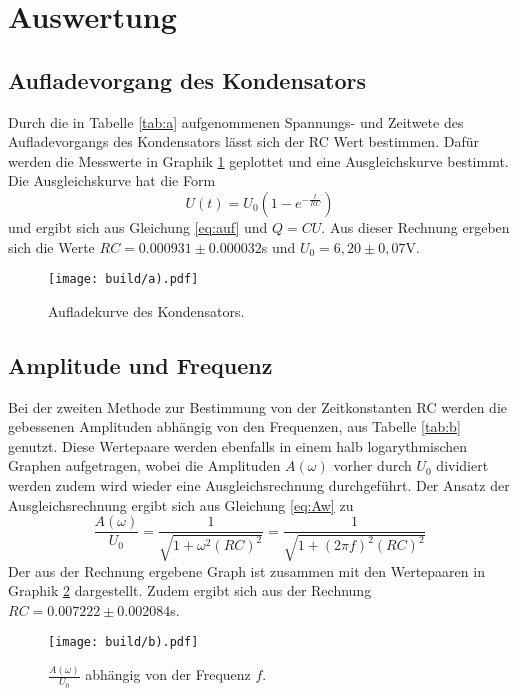 \section{Auswertung}
\label{sec:Auswertung}

\subsection{Aufladevorgang des Kondensators}
\label{sec:Auswertung1}

Durch die in Tabelle \ref{tab:a} aufgenommenen Spannungs- und Zeitwete des Aufladevorgangs des Kondensators lässt sich 
der RC Wert bestimmen. Dafür werden die Messwerte in Graphik \ref{fig:a} geplottet und eine Ausgleichskurve bestimmt. 
Die Ausgleichskurve hat die Form 
\begin{equation}
    U(t) = U_0 \left(1- e^{-\frac{t}{RC}}\right)
\end{equation}
und ergibt sich aus Gleichung \ref{eq:auf} und $Q = CU$.
Aus dieser Rechnung ergeben sich die Werte $RC = 0.000931 \pm 0.000032$s und $U_0 = 6,20 \pm 0,07$V.
\begin{figure}[H]
    \centering
    \texttt{[image: build/a).pdf]}
    \caption{Aufladekurve des Kondensators.}
    \label{fig:a}
\end{figure}

\subsection{Amplitude und Frequenz}
\label{sec:b}

Bei der zweiten Methode zur Bestimmung von der Zeitkonstanten RC werden die gebessenen Amplituden abhängig von den Frequenzen, aus Tabelle \ref{tab:b} genutzt.
Diese Wertepaare werden ebenfalls in einem halb logarythmischen Graphen aufgetragen, wobei die Amplituden $A(\omega)$ vorher durch $U_0$ dividiert werden 
zudem wird wieder eine Ausgleichsrechnung durchgeführt. 
Der Ansatz der Ausgleichsrechnung ergibt sich aus Gleichung \ref{eq:Aw} zu 
\begin{equation}
    \frac{A(\omega)}{U_0} = \frac{1}{\sqrt{1 + \omega^2 (RC)^2}} = \frac{1}{\sqrt{1 + (2 \pi f)^2 (RC)^2}}
\end{equation}
Der aus der Rechnung ergebene Graph ist zusammen mit den Wertepaaren in Graphik \ref{fig:b} dargestellt. 
Zudem ergibt sich aus der Rechnung $RC = 0.007222 \pm 0.002084$s.
\begin{figure}[H]
    \centering
    \texttt{[image: build/b).pdf]}
    \caption{$\frac{A(\omega)}{U_0}$ abhängig von der Frequenz $f$.}
    \label{fig:b}
\end{figure}


